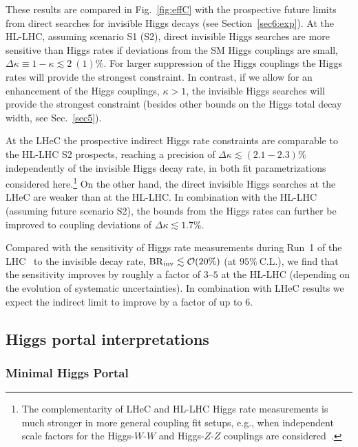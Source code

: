 \documentclass[../report.tex]{subfiles}
\begin{document}
These results are compared in Fig.~\ref{fig:effC} with the prospective future limits from direct searches for invisible Higgs decays (see Section~\ref{sec6:exp}). At the HL-LHC, assuming scenario S1 (S2), direct invisible Higgs searches are more sensitive than Higgs rates if deviations from the SM Higgs couplings are small, $\Delta \kappa \equiv 1- \kappa \lesssim 2~(1)\%$. For larger suppression of the Higgs couplings the Higgs rates will provide the strongest constraint. In contrast, if we allow for an enhancement of the Higgs couplings, $\kappa > 1$, the invisible Higgs searches will provide the strongest constraint (besides other bounds on the Higgs total decay width, see Sec.~\ref{sec5}).



At the LHeC the prospective indirect Higgs rate constraints are comparable to the HL-LHC S2 prospects, reaching a precision of $\Delta \kappa \lesssim (2.1-2.3)\%$ independently of the invisible Higgs decay rate, in both fit parametrizations considered here.\footnote{The complementarity of LHeC and HL-LHC Higgs rate measurements is much stronger in more general coupling fit setups, e.g., when independent scale factors for the Higgs-$W$-$W$ and Higgs-$Z$-$Z$ couplings are considered~\cite{uta}.} On the other hand, the direct invisible Higgs searches at the LHeC are weaker than at the HL-LHC. In combination with the HL-LHC (assuming future scenario S2), the bounds from the Higgs rates can further be improved to coupling deviations of $\Delta \kappa \lesssim1.7\%$. 

{Compared with the sensitivity of Higgs rate measurements during Run~1 of the LHC~\cite{Khachatryan:2016vau} to the invisible decay rate, $\mathrm{BR}_\mathrm{inv} \lesssim \mathcal{O}({20\%})$} (at $95\%~\mathrm{C.L.}$), we find that the sensitivity improves by roughly a factor of $3$--$5$  at the HL-LHC (depending on the evolution of systematic uncertainties). In combination with LHeC results we expect the indirect limit to improve by a factor of up to $6$.



\subsection{Higgs portal interpretations}

\subsubsection{Minimal Higgs Portal}
\label{sec6:minimalHP}
\end{document}
